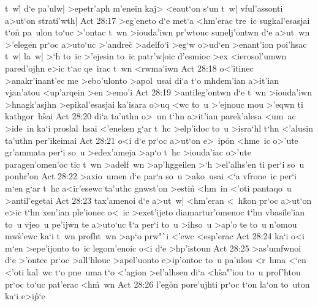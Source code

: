 t~w|\r{}
d`e
pa'ulw|
>epetr'aph
m'enein
kaj>
<eaut`on
s`un
t~w|
vful'assonti
a>ut`on
strati'wth|\bibvsend
\vs Act 28:17
>eg'eneto
d`e
met`a
<hm'erac
tre~ic
sugkal'esasjai
t`on\r{}
pa~ulon
to`uc
>'ontac
t~wn
>iouda'iwn
pr'wtouc
sunelj'ontwn
d`e
a>ut~wn
>'elegen
pr`oc
a>uto`uc
>'andrec\r{}
>adelfo`i
>eg`w
o>ud`en
>enant'ion
poi'hsac
t~w|
la~w|
>`h
to~ic
>'ejesin
to~ic
patr'w|oic
d'esmioc
>ex
<ierosol'umwn
pared'ojhn
e>ic
t`ac
qe~irac
t~wn
<rwma'iwn\bibvsend
\vs Act 28:18
o<'itinec
>anakr'inant'ec
me
>ebo'ulonto
>apol~usai
di`a
t`o
mhdem'ian
a>it'ian
vjan'atou
<up'arqein
>en
>emo'i\bibvsend
\vs Act 28:19
>antileg'ontwn
d`e
t~wn
>iouda'iwn
>hnagk'asjhn
>epikal'esasjai
ka'isara
o>uq
<wc
to~u
>'ejnouc
mou
>'eqwn
ti
kathgor~h\r{s}ai\bibvsend
{}
\vs Act 28:20
di`a
ta'uthn
o>~un
t`hn
a>it'ian
parek'alesa
<um~ac
>ide~in
ka`i
proslal~hsai
<'eneken
g`ar
t~hc
>elp'idoc
to~u
>isra`hl
t`hn
<'alusin
ta'uthn
per'ikeimai\bibvsend
\vs Act 28:21
o<i
d`e
pr`oc
a>ut`on
e>~ip\r{o}n
<hme~ic
o>'ute
gr'ammata
per`i
so~u
>edex'ameja
>ap`o
t~hc
>iouda'iac
o>'ute
paragen'omen'oc
tic
t~wn
>adelf~wn
>ap'hggeilen
>`h
>el'alhs'en
ti
per`i
so~u
ponhr'on\bibvsend
\vs Act 28:22
>axio~umen
d`e
par`a
so~u
>ako~usai
<`a
vfrone~ic
per`i
m`en
g`ar
t~hc
a<ir'esewc
ta'uthc
gnwst'on
>estin\r{}
<hm~in
<'oti
pantaqo~u
>antil'egetai\bibvsend
\vs Act 28:23
tax'amenoi
d`e
a>ut~w|
<hm'eran
<~h\r{k}on
pr`oc
a>ut`on
e>ic
t`hn
xen'ian
ple'ionec
o<~ic
>exet'ijeto
diamartur'omenoc
t`hn
vbasile'ian
to~u
vjeo~u
pe'ijwn
te
a>uto`uc
\r{t}`a
per`i
to~u
>ihso~u
>ap'o
te
to~u
n'omou
mw\r{s}'ewc
ka`i
t~wn
profht~wn
>ap`o
prw"`i
<'ewc
<esp'erac\bibvsend
\vs Act 28:24
ka`i
o<i
m`en
>epe'ijonto
to~ic
legom'enoic
o<i
d`e
>hp'istoun\bibvsend
\vs Act 28:25
>as'umfwnoi
d`e
>'ontec
pr`oc
>all'hlouc
>apel'uonto
e>ip'ontoc
to~u
pa'ulou
<r~hma
<`en
<'oti
kal~wc
t`o
pne~uma
t`o
<'agion
>el'alhsen
di`a
<h\r{s}a"'iou
to~u
prof'htou
pr`oc
to`uc
pat'erac
<h\r{m}~wn\bibvsend
{}
\vs Act 28:26
l'eg\r{o}n
pore'ujhti
pr`oc
t`on
la`on
to~uton
ka`i
e>i\r{p}`e
